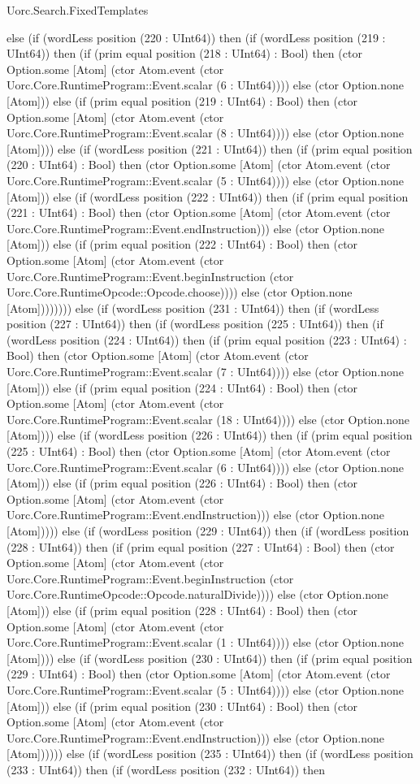 \begin{lexlean}{Uorc.Search.FixedTemplates}
\begin{semanticmodule}
{else (if (wordLess position (220 : UInt64)) then (if (wordLess position (219 : UInt64)) then (if (prim equal position (218 : UInt64) : Bool) then (ctor Option.some [Atom] (ctor Atom.event (ctor Uorc.Core.RuntimeProgram::Event.scalar (6 : UInt64)))) else (ctor Option.none [Atom])) else (if (prim equal position (219 : UInt64) : Bool) then (ctor Option.some [Atom] (ctor Atom.event (ctor Uorc.Core.RuntimeProgram::Event.scalar (8 : UInt64)))) else (ctor Option.none [Atom]))) else (if (wordLess position (221 : UInt64)) then (if (prim equal position (220 : UInt64) : Bool) then (ctor Option.some [Atom] (ctor Atom.event (ctor Uorc.Core.RuntimeProgram::Event.scalar (5 : UInt64)))) else (ctor Option.none [Atom])) else (if (wordLess position (222 : UInt64)) then (if (prim equal position (221 : UInt64) : Bool) then (ctor Option.some [Atom] (ctor Atom.event (ctor Uorc.Core.RuntimeProgram::Event.endInstruction))) else (ctor Option.none [Atom])) else (if (prim equal position (222 : UInt64) : Bool) then (ctor Option.some [Atom] (ctor Atom.event (ctor Uorc.Core.RuntimeProgram::Event.beginInstruction (ctor Uorc.Core.RuntimeOpcode::Opcode.choose)))) else (ctor Option.none [Atom]))))))) else (if (wordLess position (231 : UInt64)) then (if (wordLess position (227 : UInt64)) then (if (wordLess position (225 : UInt64)) then (if (wordLess position (224 : UInt64)) then (if (prim equal position (223 : UInt64) : Bool) then (ctor Option.some [Atom] (ctor Atom.event (ctor Uorc.Core.RuntimeProgram::Event.scalar (7 : UInt64)))) else (ctor Option.none [Atom])) else (if (prim equal position (224 : UInt64) : Bool) then (ctor Option.some [Atom] (ctor Atom.event (ctor Uorc.Core.RuntimeProgram::Event.scalar (18 : UInt64)))) else (ctor Option.none [Atom]))) else (if (wordLess position (226 : UInt64)) then (if (prim equal position (225 : UInt64) : Bool) then (ctor Option.some [Atom] (ctor Atom.event (ctor Uorc.Core.RuntimeProgram::Event.scalar (6 : UInt64)))) else (ctor Option.none [Atom])) else (if (prim equal position (226 : UInt64) : Bool) then (ctor Option.some [Atom] (ctor Atom.event (ctor Uorc.Core.RuntimeProgram::Event.endInstruction))) else (ctor Option.none [Atom])))) else (if (wordLess position (229 : UInt64)) then (if (wordLess position (228 : UInt64)) then (if (prim equal position (227 : UInt64) : Bool) then (ctor Option.some [Atom] (ctor Atom.event (ctor Uorc.Core.RuntimeProgram::Event.beginInstruction (ctor Uorc.Core.RuntimeOpcode::Opcode.naturalDivide)))) else (ctor Option.none [Atom])) else (if (prim equal position (228 : UInt64) : Bool) then (ctor Option.some [Atom] (ctor Atom.event (ctor Uorc.Core.RuntimeProgram::Event.scalar (1 : UInt64)))) else (ctor Option.none [Atom]))) else (if (wordLess position (230 : UInt64)) then (if (prim equal position (229 : UInt64) : Bool) then (ctor Option.some [Atom] (ctor Atom.event (ctor Uorc.Core.RuntimeProgram::Event.scalar (5 : UInt64)))) else (ctor Option.none [Atom])) else (if (prim equal position (230 : UInt64) : Bool) then (ctor Option.some [Atom] (ctor Atom.event (ctor Uorc.Core.RuntimeProgram::Event.endInstruction))) else (ctor Option.none [Atom]))))) else (if (wordLess position (235 : UInt64)) then (if (wordLess position (233 : UInt64)) then (if (wordLess position (232 : UInt64)) then }
\end{semanticmodule}
\end{lexlean}
